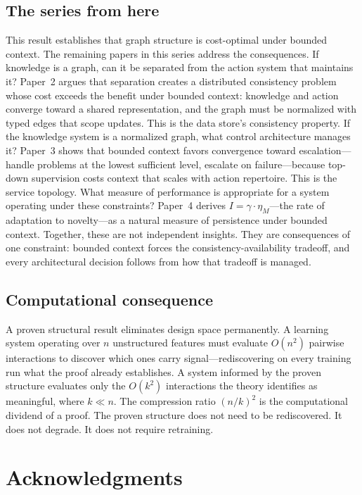 \documentclass[11pt]{article}
\theoremstyle{definition}
\begin{document}
\subsection*{The series from here}

This result establishes that graph structure is cost-optimal under
bounded context. The remaining papers in this series address the
consequences.
If knowledge is a graph, can it be separated from the action system
that maintains it? Paper~2 \cite{McCarthy2026b} argues that
separation creates a distributed consistency problem whose cost
exceeds the benefit under bounded context: knowledge and action converge
toward a shared representation, and the graph must be normalized with
typed edges that scope updates. This is the data store's consistency
property.
If the knowledge system is a normalized graph, what control
architecture manages it? Paper~3 \cite{McCarthy2026c} shows that
bounded context favors convergence toward escalation---handle
problems at the lowest sufficient level, escalate on failure---because
top-down supervision costs context that scales with action repertoire.
This is the service topology.
What measure of performance is appropriate for a system operating
under these constraints? Paper~4 \cite{McCarthy2026d} derives
$I = \gamma \cdot \eta_M$---the rate of adaptation to novelty---as
a natural measure of persistence under bounded context.
Together, these are not independent insights. They are consequences
of one constraint: bounded context forces the
consistency-availability tradeoff, and every architectural decision
follows from how that tradeoff is managed.

\subsection*{Computational consequence}

A proven structural result eliminates design space permanently.
A learning system operating over $n$ unstructured features must
evaluate $O(n^2)$ pairwise interactions to discover which ones
carry signal---rediscovering on every training run what the proof
already establishes. A system informed by the proven structure
evaluates only the $O(k^2)$ interactions the theory identifies as
meaningful, where $k \ll n$. The compression ratio $(n/k)^2$ is
the computational dividend of a proof. The proven structure does not
need to be rediscovered. It does not degrade. It does not require
retraining.

\section*{Acknowledgments}
\end{document}
